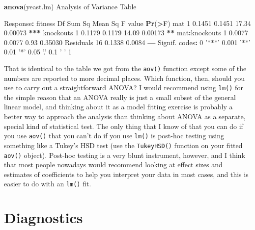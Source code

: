 \documentclass[
]{book}
\newenvironment{Shaded}{\begin{snugshade}}{\end{snugshade}}
\newcommand{\DecValTok}[1]{\textcolor[rgb]{0.00,0.00,0.81}{#1}}
\newcommand{\ErrorTok}[1]{\textcolor[rgb]{0.64,0.00,0.00}{\textbf{#1}}}
\newcommand{\FloatTok}[1]{\textcolor[rgb]{0.00,0.00,0.81}{#1}}
\newcommand{\KeywordTok}[1]{\textcolor[rgb]{0.13,0.29,0.53}{\textbf{#1}}}
\newcommand{\NormalTok}[1]{#1}
\newcommand{\OperatorTok}[1]{\textcolor[rgb]{0.81,0.36,0.00}{\textbf{#1}}}
\newcommand{\StringTok}[1]{\textcolor[rgb]{0.31,0.60,0.02}{#1}}
\begin{document}
\begin{Shaded}
\begin{Highlighting}[]
\KeywordTok{anova}\NormalTok{(yeast.lm)}
\NormalTok{Analysis of Variance Table}

\NormalTok{Response}\OperatorTok{:}\StringTok{ }\NormalTok{fitness}
\NormalTok{              Df Sum Sq Mean Sq F value  }\KeywordTok{Pr}\NormalTok{(}\OperatorTok{>}\NormalTok{F)    }
\NormalTok{mat            }\DecValTok{1} \FloatTok{0.1451}  \FloatTok{0.1451}   \FloatTok{17.34} \FloatTok{0.00073} \OperatorTok{**}\ErrorTok{*}
\NormalTok{knockouts      }\DecValTok{1} \FloatTok{0.1179}  \FloatTok{0.1179}   \FloatTok{14.09} \FloatTok{0.00173} \OperatorTok{**}\StringTok{ }
\NormalTok{mat}\OperatorTok{:}\NormalTok{knockouts  }\DecValTok{1} \FloatTok{0.0077}  \FloatTok{0.0077}    \FloatTok{0.93} \FloatTok{0.35030}    
\NormalTok{Residuals     }\DecValTok{16} \FloatTok{0.1338}  \FloatTok{0.0084}                    
\OperatorTok{---}
\NormalTok{Signif. codes}\OperatorTok{:}\StringTok{  }\DecValTok{0} \StringTok{'***'} \FloatTok{0.001} \StringTok{'**'} \FloatTok{0.01} \StringTok{'*'} \FloatTok{0.05} \StringTok{'.'} \FloatTok{0.1} \StringTok{' '} \DecValTok{1}
\end{Highlighting}
\end{Shaded}

That is identical to the table we got from the \texttt{aov()} function except some of the numbers are reported to more decimal places. Which function, then, should you use to carry out a straightforward ANOVA? I would recommend using \texttt{lm()} for the simple reason that an ANOVA really is just a small subset of the general linear model, and thinking about it as a model fitting exercise is probably a better way to approach the analysis than thinking about ANOVA as a separate, special kind of statistical test. The only thing that I know of that you can do if you use \texttt{aov()} that you can't do if you use \texttt{lm()} is post-hoc testing using something like a Tukey's HSD test (use the \texttt{TukeyHSD()} function on your fitted \texttt{aov()} object). Post-hoc testing is a very blunt instrument, however, and I think that most people nowadays would recommend looking at effect sizes and estimates of coefficients to help you interpret your data in most cases, and this is easier to do with an \texttt{lm()} fit.

\hypertarget{diagnostics}{%
\section{Diagnostics}\label{diagnostics}}
\end{document}
